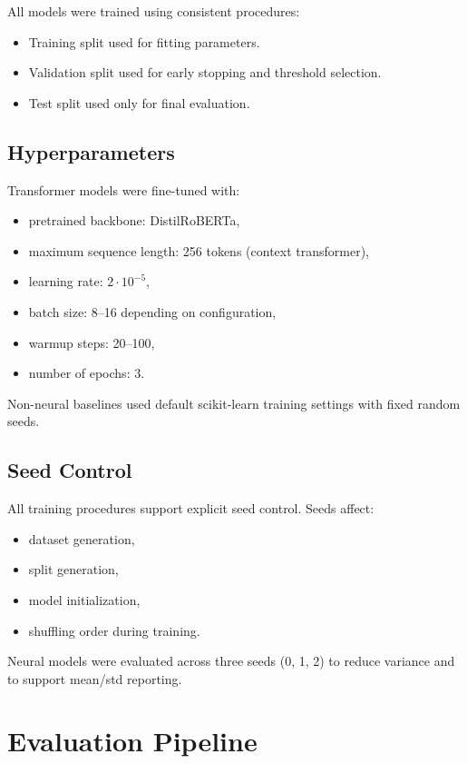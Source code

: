 All models were trained using consistent procedures:

\begin{itemize}
    \item Training split used for fitting parameters.
    \item Validation split used for early stopping and threshold selection.
    \item Test split used only for final evaluation.
\end{itemize}

\subsection{Hyperparameters}

Transformer models were fine-tuned with:

\begin{itemize}
    \item pretrained backbone: DistilRoBERTa,
    \item maximum sequence length: 256 tokens (context transformer),
    \item learning rate: $2 \cdot 10^{-5}$,
    \item batch size: 8--16 depending on configuration,
    \item warmup steps: 20--100,
    \item number of epochs: 3.
\end{itemize}

Non-neural baselines used default scikit-learn training settings with fixed random seeds.

\subsection{Seed Control}

All training procedures support explicit seed control. Seeds affect:

\begin{itemize}
    \item dataset generation,
    \item split generation,
    \item model initialization,
    \item shuffling order during training.
\end{itemize}

Neural models were evaluated across three seeds (0, 1, 2) to reduce variance and to support mean/std reporting.

\section{Evaluation Pipeline}
\label{subsec:evaluation_pipeline}

